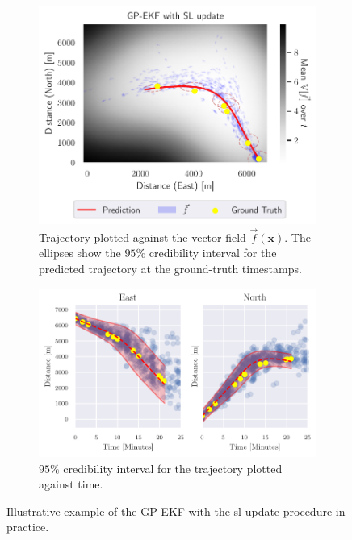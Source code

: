 \begin{figure}
    \centering
    \begin{subfigure}{\textwidth}
        \centering
        \includegraphics[width=\textwidth]{figures/dyngp/gp_ekf_with_syn.pdf}
        \caption{Trajectory plotted against the vector-field $\vec{f}(\boldsymbol{x})$. The ellipses show the $95\%$ credibility interval for the predicted trajectory at the ground-truth timestamps.}
    \end{subfigure}
    \begin{subfigure}{\textwidth}
        \centering
        \includegraphics[width=\textwidth]{figures/dyngp/gp_ekf_with_syn_state.pdf}
        \caption{$95\%$ credibility interval for the trajectory plotted against time.}
    \end{subfigure}
    \caption{Illustrative example of the GP-EKF with the \acrshort{sl} update procedure in practice.}
    \label{fig:gp_ekf_with_syn}
\end{figure}



